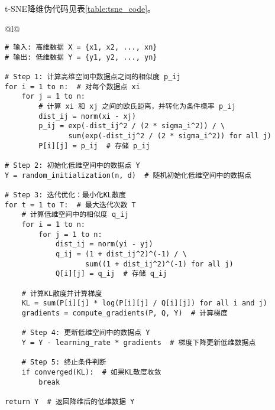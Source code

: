 \documentclass[master]{thesis-uestc}
\begin{document}
t-SNE降维伪代码见表\ref{table:tsne_code}。
\begin{table}[h]
    \caption{t-SNE算法伪代码}
    \begin{tabular}{@{}l@{}} %
    \toprule
     \\ %
    \midrule
    \begin{lstlisting}[basicstyle=\ttfamily,frame=none]
# 输入: 高维数据 X = {x1, x2, ..., xn}
# 输出: 低维数据 Y = {y1, y2, ..., yn}

# Step 1: 计算高维空间中数据点之间的相似度 p_ij
for i = 1 to n:  # 对每个数据点 xi
    for j = 1 to n:
        # 计算 xi 和 xj 之间的欧氏距离，并转化为条件概率 p_ij
        dist_ij = norm(xi - xj)
        p_ij = exp(-dist_ij^2 / (2 * sigma_i^2)) / \
               sum(exp(-dist_ij^2 / (2 * sigma_i^2)) for all j)
        P[i][j] = p_ij  # 存储 p_ij
    
# Step 2: 初始化低维空间中的数据点 Y
Y = random_initialization(n, d)  # 随机初始化低维空间中的数据点

# Step 3: 迭代优化：最小化KL散度
for t = 1 to T:  # 最大迭代次数 T
    # 计算低维空间中的相似度 q_ij
    for i = 1 to n:
        for j = 1 to n:
            dist_ij = norm(yi - yj)
            q_ij = (1 + dist_ij^2)^(-1) / \
                   sum((1 + dist_ij^2)^(-1) for all j)
            Q[i][j] = q_ij  # 存储 q_ij

    # 计算KL散度并计算梯度
    KL = sum(P[i][j] * log(P[i][j] / Q[i][j]) for all i and j)
    gradients = compute_gradients(P, Q, Y)  # 计算梯度
    
    # Step 4: 更新低维空间中的数据点 Y
    Y = Y - learning_rate * gradients  # 梯度下降更新低维数据点

    # Step 5: 终止条件判断
    if converged(KL):  # 如果KL散度收敛
        break

return Y  # 返回降维后的低维数据 Y
    \end{lstlisting} \\
    \bottomrule
    \end{tabular}
    \label{table:tsne_code}
\end{table}
\end{document}
